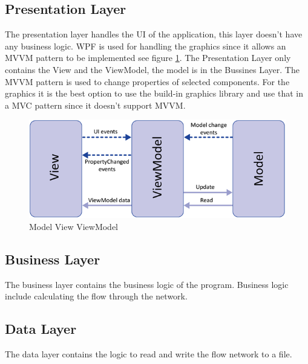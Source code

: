 \subsection{Presentation Layer}
The presentation layer handles the UI of the application, this layer doesn't have any business logic. WPF is used for handling the graphics since it allows an MVVM pattern to be implemented see figure \ref{fig:mvvm}. The Presentation Layer only contains the View and the ViewModel, the model is in the Bussines Layer. The MVVM pattern is used to change properties of selected components. For the graphics it is the best option to use the build-in graphics library and use that in a MVC pattern since it doesn't support MVVM.
\begin{figure}[h!]
  \centering
    \includegraphics[scale=0.8]{figures/mvvm.png}
  \caption{Model View ViewModel}
  \label{fig:mvvm}
\end{figure}


\subsection{Business Layer}
The business layer contains the business logic of the program. Business logic include calculating the flow through the network.

\subsection{Data Layer}
The data layer contains the logic to read and write the flow network to a file.